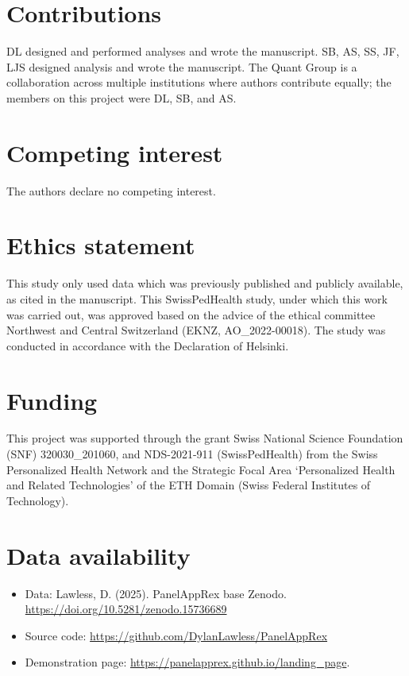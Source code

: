 \section*{Contributions}
\noindent 
DL designed and performed analyses and wrote the manuscript.
SB, AS, SS, JF, LJS designed analysis and wrote the manuscript.
The Quant Group is a collaboration across multiple institutions where authors contribute equally; the members on this project were DL, SB, and AS.

\section*{Competing interest}
\noindent
The authors declare no competing interest. 

\section*{Ethics statement}
\noindent
This study only used data which was previously published and publicly available, as cited in the manuscript.
This  SwissPedHealth study, under which this work was carried out, was approved based on the advice of the ethical committee Northwest and Central Switzerland (EKNZ, AO\_2022-00018). 
The study was conducted in accordance with the Declaration of Helsinki.

\section*{Funding}
\noindent This project was supported through the grant Swiss National Science Foundation  (SNF) 320030\_201060, and NDS-2021-911 (SwissPedHealth) from the Swiss Personalized Health Network and the Strategic Focal Area `Personalized Health and Related Technologies' of the ETH Domain (Swiss Federal Institutes of Technology).

\section*{Data availability}
\begin{itemize}
\item Data: Lawless, D. (2025). PanelAppRex base Zenodo. \url{https://doi.org/10.5281/zenodo.15736689}
\item Source code: \url{https://github.com/DylanLawless/PanelAppRex}
\item Demonstration page: \DIFdelbegin %
\DIFdelend \DIFaddbegin \url{https://panelapprex.github.io/landing_page}\DIFaddend . 
\end{itemize}

